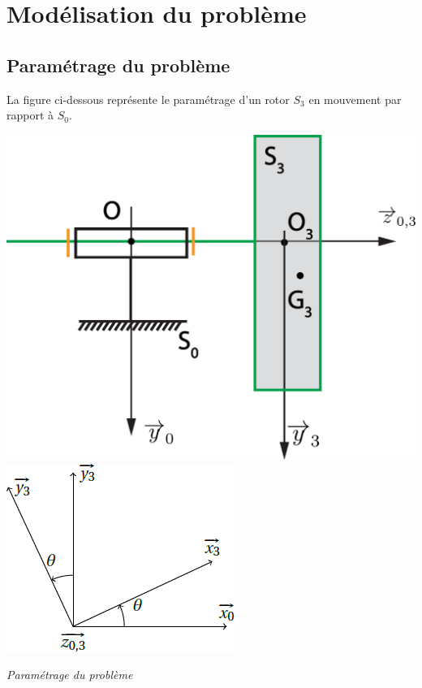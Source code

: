 \documentclass[10pt,fleqn]{article} %
\begin{document}
\section{Modélisation du problème}
\subsection{Paramétrage du problème}

\begin{multicols}{2}
La figure ci-dessous représente le paramétrage d'un rotor $S_3$ en mouvement par rapport à $S_0$.

\begin{center}
\includegraphics[width=.8\linewidth]{images/figure_presentation.pdf}
\includegraphics[width=.4\linewidth]{images/sc}
\end{center}
\textit{Paramétrage du problème}




\end{multicols}
\end{document}
